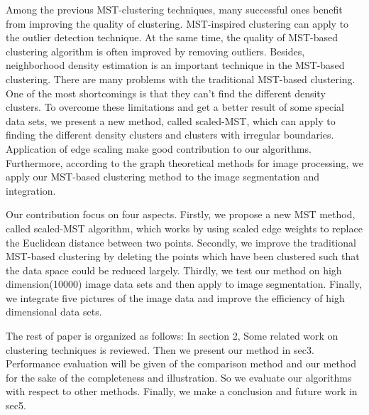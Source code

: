   Among the previous MST-clustering techniques, many successful ones benefit from improving the quality of clustering. MST-inspired clustering can apply to the outlier detection technique\cite{Wang2012A}. At the same time, the quality of MST-based clustering algorithm is often improved by removing outliers\cite{Wang2013Enhancing}. Besides, neighborhood density estimation is an important technique in the MST-based clustering\cite{Luo2010A}. There are many problems with the traditional MST-based clustering. One of the most shortcomings is that they can't find the different density clusters. To overcome these limitations and get a better result of some special data sets, we present a new method, called scaled-MST, which can apply to finding the different density clusters and clusters with irregular boundaries. Application of edge scaling make good contribution to our algorithms. Furthermore, according to the graph theoretical methods for image processing, we apply our MST-based clustering method to the image segmentation and integration. 

  Our contribution focus on four aspects. Firstly, we propose a new MST method, called scaled-MST algorithm, which works by using scaled edge weights to replace the Euclidean distance between two points. Secondly, we improve the traditional MST-based clustering by deleting the points which have been clustered such that the data space could be reduced largely. Thirdly, we test our method on high dimension(10000) image data sets and then apply to image segmentation. Finally, we integrate five pictures of the image data and improve the efficiency of high dimensional data sets. 

  The rest of paper is organized as follows: In section 2, Some related work on clustering techniques is reviewed. Then we present our method in sec3. Performance evaluation will be given of the comparison method and our method for the sake of the completeness and illustration. So we evaluate our algorithms with respect to other methods. Finally, we make a conclusion and future work in sec5.
